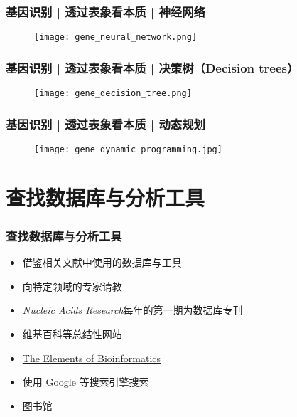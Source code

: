 \begin{frame}
  \frametitle{基因识别 | 透过表象看本质 | 神经网络}
  \begin{figure}
    \centering
    \texttt{[image: gene\_neural\_network.png]}
  \end{figure}
\end{frame}

\begin{frame}
  \frametitle{基因识别 | 透过表象看本质 | 决策树（Decision trees）}
  \begin{figure}
    \centering
    \texttt{[image: gene\_decision\_tree.png]}
  \end{figure}
\end{frame}

\begin{frame}
  \frametitle{基因识别 | 透过表象看本质 | 动态规划}
  \begin{figure}
    \centering
    \texttt{[image: gene\_dynamic\_programming.jpg]}
  \end{figure}
\end{frame}

\section{查找数据库与分析工具}
\begin{frame}
  \frametitle{查找数据库与分析工具}
  \pause
  \begin{itemize}
    \item 借鉴相关文献中使用的数据库与工具
    \item 向特定领域的专家请教
    \item \textit{Nucleic Acids Research}每年的第一期为数据库专刊
    \item 维基百科等总结性网站
    \item \href{http://elements.eaglegenomics.com/}{The Elements of Bioinformatics}
    \item 使用 Google 等搜索引擎搜索
    \item 图书馆
  \end{itemize}
\end{frame}

